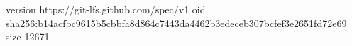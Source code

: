 version https://git-lfs.github.com/spec/v1
oid sha256:b14acfbc9615b5cbbfa8d864c7443da4462b3edeceb307bcfef3e2651fd72e69
size 12671
